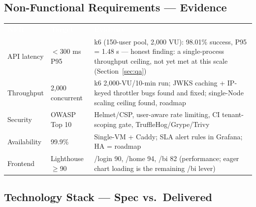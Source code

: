 \documentclass[11pt,a4paper]{article}
\begin{document}
\subsection{Non-Functional Requirements --- Evidence}

\begin{table}[H]
\centering\small
\renewcommand{\arraystretch}{1.25}
\begin{tabularx}{\textwidth}{l l X}
\toprule
\rowcolor{amdoxnavy}
\textcolor{white}{\textbf{NFR}} &
\textcolor{white}{\textbf{Target}} &
\textcolor{white}{\textbf{Evidence}} \\
API latency   & $<$300 ms P95 & k6 (150-user pool, 2{,}000 VU): 98.01\% success, P95 = 1.48 s --- honest finding: a single-process throughput ceiling, not yet met at this scale (Section~\ref{sec:qa}) \\
\rowcolor{amdoxlight}
Throughput    & 2{,}000 concurrent & k6 2{,}000-VU/10-min run; JWKS caching + IP-keyed throttler bugs found and fixed; single-Node scaling ceiling found, roadmap \\
Security      & OWASP Top 10 & Helmet/CSP, user-aware rate limiting, CI tenant-scoping gate, TruffleHog/Grype/Trivy \\
\rowcolor{amdoxlight}
Availability  & 99.9\% & Single-VM + Caddy; SLA alert rules in Grafana; HA = roadmap \\
Frontend      & Lighthouse $\geq$90 & /login 90, /home 94, /bi 82 (performance; eager chart loading is the remaining /bi lever) \\
\bottomrule
\end{tabularx}
\end{table}

\subsection{Technology Stack --- Spec vs.\ Delivered}
\end{document}
